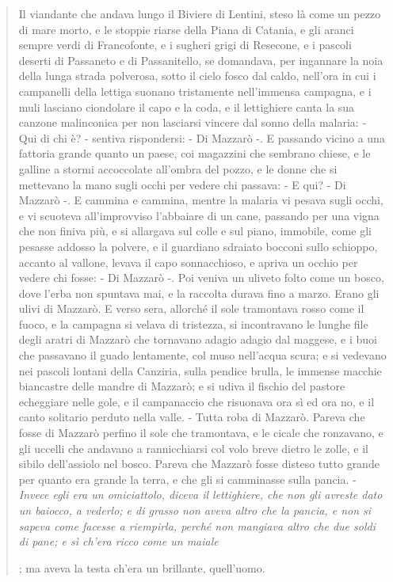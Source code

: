 \documentclass{book}
\newcounter{mar}
\newcommand{\mar}[2]{
\addtocounter{mar}{1}
\hspace{-0.73em}\textsuperscript{\hyperref[\thechapter.\themar]{\themar}}\marginpar{\footnotesize\textbf{\themar}\label{\thechapter.\themar}. #2}\hspace{-0.4em}
}
\newcommand{\mat}[1]{\mar{gg}{#1}}
\begin{document}
\setcounter{mar}{0}

\begin{quote}
Il viandante che andava lungo il Biviere di Lentini, steso là come un pezzo di mare morto, e le stoppie riarse della Piana di Catania, e gli aranci sempre verdi di Francofonte, e i sugheri grigi di Resecone, e i pascoli deserti di Passaneto e di Passanitello, se domandava, per ingannare la noia della lunga strada polverosa, sotto il cielo fosco dal caldo, nell'ora in cui i campanelli della lettiga suonano tristamente nell'immensa campagna, e i muli lasciano ciondolare il capo e la coda, e il lettighiere canta la sua canzone malinconica per non lasciarsi vincere dal sonno della malaria: - Qui di chi è? - sentiva rispondersi: - Di Mazzarò -. E passando vicino a una fattoria grande quanto un paese, coi magazzini che sembrano chiese, e le galline a stormi accoccolate all'ombra del pozzo, e le donne che si mettevano la mano sugli occhi per vedere chi passava: - E qui? - Di Mazzarò -. E cammina e cammina, mentre la malaria vi pesava sugli occhi, e vi scuoteva all'improvviso l'abbaiare di un cane, passando per una vigna che non finiva più, e si allargava sul colle e sul piano, immobile, come gli pesasse addosso la polvere, e il guardiano sdraiato bocconi sullo schioppo, accanto al vallone, levava il capo sonnacchioso, e apriva un occhio per vedere chi fosse: - Di Mazzarò -. Poi veniva un uliveto folto come un bosco, dove l'erba non spuntava mai, e la raccolta durava fino a marzo. Erano gli ulivi di Mazzarò. E verso sera, allorché il sole tramontava rosso come il fuoco, e la campagna si velava di tristezza, si incontravano le lunghe file degli aratri di Mazzarò che tornavano adagio adagio dal maggese, e i buoi che passavano il guado lentamente, col muso nell'acqua scura; e si vedevano nei pascoli lontani della Canziria, sulla pendice brulla, le immense macchie biancastre delle mandre di Mazzarò; e si udiva il fischio del pastore echeggiare nelle gole, e il campanaccio che risuonava ora sì ed ora no, e il canto solitario perduto nella valle. - Tutta roba di Mazzarò. Pareva che fosse di Mazzarò perfino il sole che tramontava, e le cicale che ronzavano, e gli uccelli che andavano a rannicchiarsi col volo breve dietro le zolle, e il sibilo dell'assiolo nel bosco. Pareva che Mazzarò fosse disteso tutto grande per quanto era grande la terra, e che gli si camminasse sulla pancia. - \textit{Invece egli era un omiciattolo, diceva il lettighiere, che non gli avreste dato un baiocco, a vederlo; e di grasso non aveva altro che la pancia, e non si sapeva come facesse a riempirla, perché non mangiava altro che due soldi di pane; e sì ch'era ricco come un maiale}\mat{insignificanza di Mazzarò, anche fisica}; ma aveva la testa ch'era un brillante, quell'uomo.


\end{quote}
\end{document}
